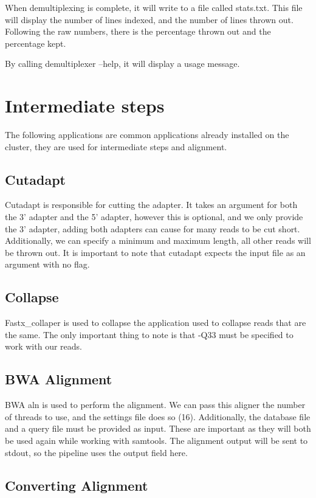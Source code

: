 \documentclass[10pt,a4paper]{article}
\begin{document}
When demultiplexing is complete, it will write to a file called stats.txt. This file will display the number of lines indexed, and the number of lines thrown out. Following the raw numbers, there is the percentage thrown out and the percentage kept. 

By calling demultiplexer --help, it will display a usage message.
\section{Intermediate steps}

The following applications are common applications already installed on the cluster, they are used for intermediate steps and alignment.

\subsection{Cutadapt}

Cutadapt is responsible for cutting the adapter. It takes an argument for both the 3' adapter and the 5' adapter, however this is optional, and we only provide the 3' adapter, adding both adapters can cause for many reads to be cut short. Additionally, we can specify a minimum and maximum length, all other reads will be thrown out. It is important to note that cutadapt expects the input file as an argument with no flag.

\subsection{Collapse}

Fastx\_collaper is used to collapse the application used to collapse reads that are the same. The only important thing to note is that -Q33 must be specified to work with our reads.

\subsection{BWA Alignment}

BWA aln is used to perform the alignment. We can pass this aligner the number of threads to use, and the settings file does so (16). Additionally, the database file and a query file must be provided as input. These are important as they will both be used again while working with samtools. The alignment output will be sent to stdout, so the pipeline uses the output field here.

\subsection{Converting Alignment}
\end{document}
